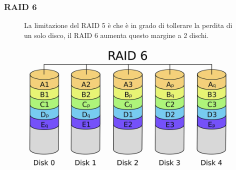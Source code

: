 \subsubsection*{RAID 6}
\begin{figure}[H]
    \centering
    \begin{minipage}{0.65\textwidth}
        La limitazione del RAID 5 è che è in grado di tollerare la perdita di un solo disco, il RAID 6 aumenta questo margine a 2 dischi.
    \end{minipage}
    \hfill
    \begin{minipage}{0.3\textwidth}
        \centering
        \includegraphics[width=1\linewidth]{assets/RAID_6.jpeg}
    \end{minipage}
\end{figure}
